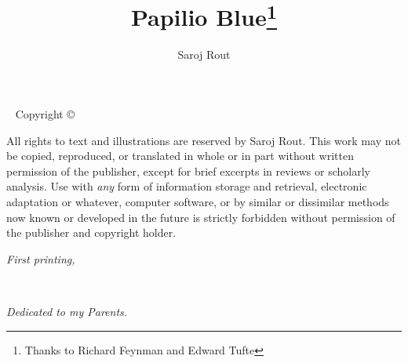 \documentclass{tufte-book}
\title{Papilio Blue\thanks{Thanks to Richard Feynman and     Edward Tufte}}
\author[Saroj Rout]{Saroj Rout}
\begin{document}
\frontmatter


\newpage\thispagestyle{empty}

\vfill
{}
\vfill

\vfill

\maketitle


\newpage
\begin{fullwidth}
~\vfill
\thispagestyle{empty}
\setlength{\parindent}{0pt}
\setlength{\parskip}{\baselineskip}
Copyright \copyright\ \the\year\ \thanklessauthor

\par{}

\par{}

\par All rights to text and illustrations are reserved by Saroj Rout. This work may not be copied, reproduced, or translated in whole or in part without written permission of the publisher, except for brief excerpts in reviews or scholarly analysis. Use with {\it any} form of information storage and retrieval, electronic adaptation or whatever, computer software, or by similar or dissimilar methods now known or developed in the future is strictly forbidden without permission of the publisher and copyright holder.

\par\textit{First printing, \monthyear}
\end{fullwidth}

\tableofcontents

\listoffigures

\listoftables

\cleardoublepage
~\vfill
\begin{doublespace}
\noindent\fontsize{18}{22}\selectfont\itshape
\nohyphenation
Dedicated to my Parents.
\end{doublespace}
\vfill
\vfill


%

\backmatter





\end{document}
